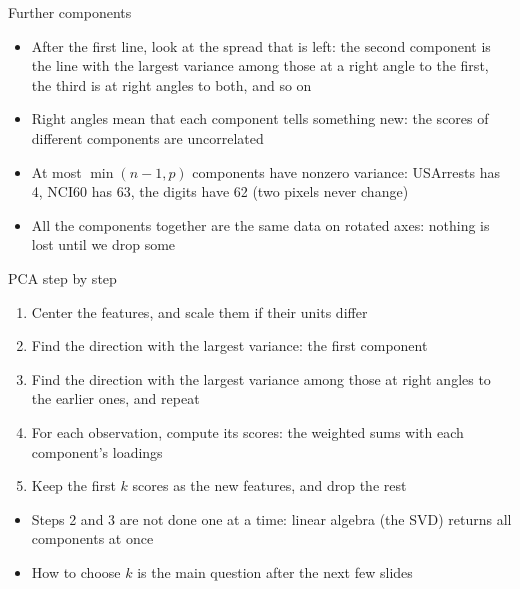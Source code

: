\begin{frame}{Further components}
    \begin{itemize}
        \item After the first line, look at the spread that is left: the second component is the line with the largest variance among those at a right angle to the first, the third is at right angles to both, and so on
        \item Right angles mean that each component tells something new: the scores of different components are uncorrelated
        \item At most $\min(n - 1, p)$ components have nonzero variance: USArrests has 4, NCI60 has 63, the digits have 62 (two pixels never change)
        \item All the components together are the same data on rotated axes: nothing is lost until we drop some
    \end{itemize}
\end{frame}

\begin{frame}{PCA step by step}
    \begin{enumerate}
        \item Center the features, and scale them if their units differ
        \item Find the direction with the largest variance: the first component
        \item Find the direction with the largest variance among those at right angles to the earlier ones, and repeat
        \item For each observation, compute its scores: the weighted sums with each component's loadings
        \item Keep the first $k$ scores as the new features, and drop the rest
    \end{enumerate}

    \svspace{0.6em}
    \begin{itemize}
        \item Steps 2 and 3 are not done one at a time: linear algebra (the SVD) returns all components at once
        \item How to choose $k$ is the main question after the next few slides
    \end{itemize}
\end{frame}

